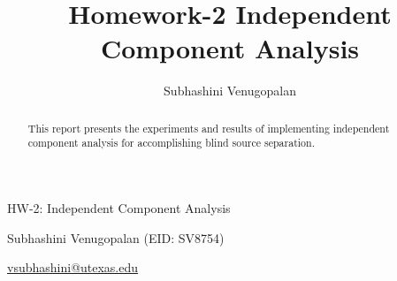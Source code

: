 \documentclass[11pt]{article}
\author{Subhashini Venugopalan }
\title{Homework-2 Independent Component Analysis}
\date{}
\begin{document}

\begin{center}{\LARGE HW-2: Independent Component Analysis}
\\
\end{center}
\centerline{\large{Subhashini Venugopalan (EID: SV8754)}}
\centerline{\href{mailto:vsubhashini@utexas.edu}{\small\ttfamily vsubhashini@utexas.edu} }

 \begin{abstract}
 {This report presents the experiments and results of implementing independent component analysis for accomplishing blind source separation.} 
 \end{abstract}
\end{document}
